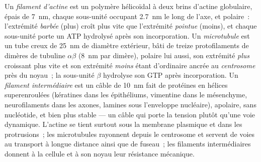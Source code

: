 \begin{definition}\label{def:b3:cytoskeleton-motility:filaments}
Un \emph{filament d'actine} est un polymère hélicoïdal à deux brins
d'actine globulaire, épais de \qty{7}{nm}, chaque sous-unité occupant
\qty{2.7}{nm} le long de l'axe, et polaire~: l'extrémité \emph{barbée}
(plus) croît plus vite que l'extrémité \emph{pointue} (moins), et
chaque sous-unité porte un ATP hydrolysé après son incorporation. Un
\emph{microtubule} est un tube creux de \qty{25}{nm} de diamètre
extérieur, bâti de treize protofilaments de dimères de tubuline
$\alpha\beta$ (\qty{8}{nm} par dimère), polaire lui aussi, son
extrémité \emph{plus} croissant plus vite et son extrémité \emph{moins}
étant d'ordinaire ancrée au \emph{centrosome} près du noyau~; la
sous-unité $\beta$ hydrolyse son GTP après incorporation. Un
\emph{filament intermédiaire} est un câble de \qty{10}{nm} fait de
protéines en hélices superenroulées (kératines dans les épithéliums,
vimentine dans le mésenchyme, neurofilaments dans les axones, lamines
sous l'enveloppe nucléaire), apolaire, sans nucléotide, et bien plus
stable --- un câble qui porte la tension plutôt qu'une voie dynamique.
L'actine se tient surtout sous la membrane plasmique et dans les
protrusions~; les microtubules rayonnent depuis le centrosome et
servent de voies au transport à longue distance ainsi que de fuseau~;
les filaments intermédiaires donnent à la cellule et à son noyau leur
résistance mécanique.
\end{definition}

